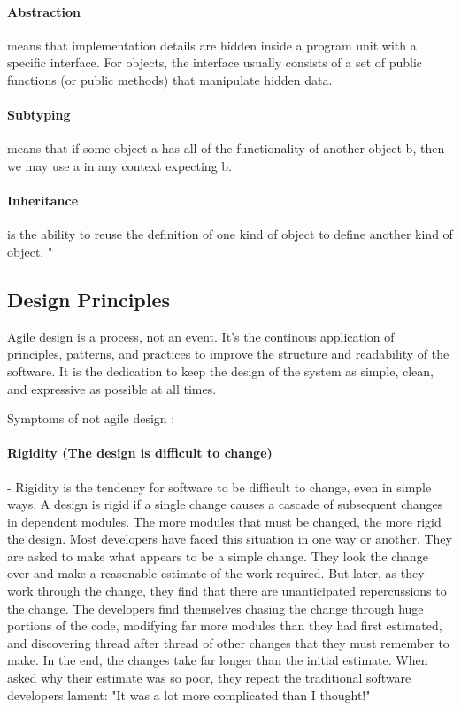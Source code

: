 \documentclass{llncs}
\begin{document}
\paragraph{Abstraction} means that implementation details are hidden inside a program unit with a specific interface. For objects, the interface usually consists of a set of public functions (or public methods) that manipulate hidden data.
\paragraph{Subtyping} means that if some object a has all of the functionality of another object b, then we may use a in any context expecting b.
\paragraph{Inheritance} is the ability to reuse the definition of one kind of object to define another kind of object.
"\cite{concepts}

\subsection{Design Principles}

Agile design is a process, not an event.
It's the continous application of principles, patterns, and practices to improve the structure and readability of the software. 
It is the dedication to keep the design of the system as simple, clean, and expressive as possible at all times.\cite{MartinASD}

Symptoms of not agile design \cite{MartinASD}:
\paragraph{Rigidity (The design is difficult to change)} - Rigidity is the tendency for software to be difficult to change, even in simple ways. A design is rigid if a single change causes a cascade of subsequent changes in dependent modules.
The more modules that must be changed, the more rigid the design.
Most developers have faced this situation in one way or another. 
They are asked to make what appears to be a simple change.
They look the change over and make a reasonable estimate of the work required.
But later, as they work through the change, they find that there are unanticipated repercussions to the change.
The developers find themselves chasing the change through huge portions of the code, modifying far more modules than they had first estimated, and discovering thread after thread of other changes that they must remember to make.
In the end, the changes take far longer than the initial estimate.
When asked why their estimate was so poor, they repeat the traditional software developers lament: "It was a lot more complicated than I thought!"
\end{document}
